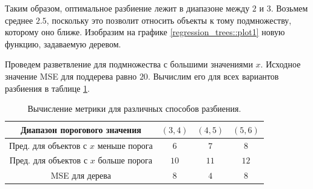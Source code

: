     Таким образом, оптимальное разбиение лежит в диапазоне между $2$ и $3$. Возьмем среднее $2.5$, поскольку это позволит относить объекты к тому подмножеству, которому оно ближе. Изобразим на графике \ref{regression_trees::plot1} новую функцию, задаваемую деревом.
    
    \begin{center}
    \label{regression_trees::plot1}
    \end{center}

    Проведем разветвление для подмножества с большими значениями $x$. Исходное значение MSE для поддерева равно $20$. Вычислим его для всех вариантов разбиения в таблице \ref{regression_trees::table2}.
    \begin{table}[h] 
    \centering
    \caption{Вычисление метрики для различных способов разбиения.}
    \begin{tabular}{|c|c|c|c|} 
    \hline
    Диапазон порогового значения & $(3, 4)$ & $(4, 5)$ & $(5, 6)$ \\
    \hline
    Пред. для объектов с $x$ меньше порога & $6$ & $7$ & $8$ \\
    \hline
    Пред. для объектов с $x$ больше порога & $10$ & $11$ & $12$ \\
    \hline
    MSE для дерева & $8$ & $4$ & $8$ \\
    \hline
    \end{tabular}
    \label{regression_trees::table2}
    \end{table}

